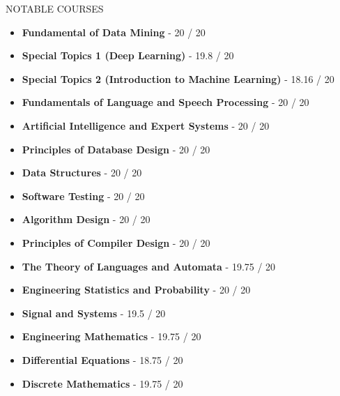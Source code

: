 \documentclass[]{CV}
\begin{document}
\vspace{-2mm}
\begin{section}{NOTABLE COURSES}
\begin{multicols}{2}
    \begin{itemize}
	\item \textbf{Fundamental of Data Mining} - 20 / 20
	\item \textbf{Special Topics 1 (Deep Learning)} - 19.8 / 20
	\item \textbf{Special Topics 2 (Introduction to Machine Learning)} - 18.16 / 20
	\item \textbf{Fundamentals of Language and Speech Processing} - 20 / 20
	\item \textbf{Artificial Intelligence and Expert Systems} - 20 / 20
	
	\item \textbf{Principles of Database Design} - 20 / 20
	\item \textbf{Data Structures} - 20 / 20
	\item \textbf{Software Testing} - 20 / 20
	\item \textbf{Algorithm Design} - 20 / 20
	\item \textbf{Principles of Compiler Design} - 20 / 20
	\item \textbf{The Theory of Languages ​​and Automata} - 19.75 / 20
	
	\item \textbf{Engineering Statistics and Probability} - 20 / 20
	\item \textbf{Signal and Systems} - 19.5 / 20
	\item \textbf{Engineering Mathematics} - 19.75 / 20
	\item \textbf{Differential Equations} - 18.75 / 20
	\item \textbf{Discrete Mathematics} - 19.75 / 20
	
    \end{itemize}
    \end{multicols}
\end{section}
\end{document}
